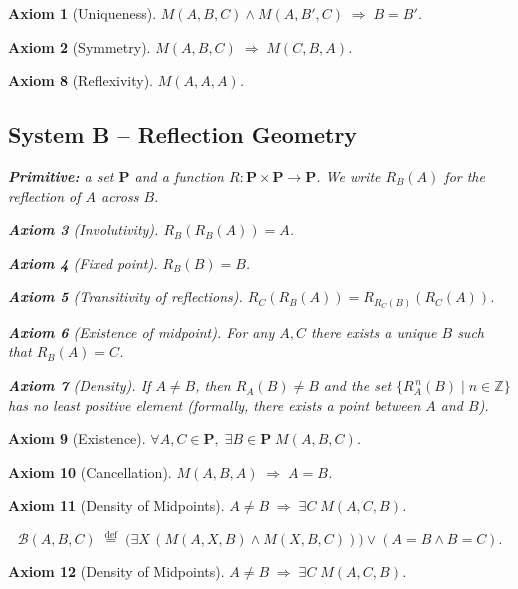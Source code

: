 \documentclass[]{article}
\newtheorem{axiom}{Axiom}
\begin{document}
\begin{axiom}[Uniqueness]
  \(M(A,B,C) \land M(A,B',C) \;\Longrightarrow\; B = B'\).
\end{axiom}
\begin{axiom}[Symmetry]
  \(M(A,B,C) \;\Longrightarrow\; M(C,B,A)\).
\end{axiom}
\begin{axiom}[Reflexivity]
  \(M(A,A,A)\).\subsection*{System B – Reflection Geometry}
\textbf{Primitive:} a set \(\mathbf{P}\) and a function
\(R : \mathbf{P} \times \mathbf{P} \to \mathbf{P}\).  We write
\(R_B(A)\) for the reflection of \(A\) across \(B\).

\begin{axiom}[Involutivity]
  \(R_B(R_B(A)) = A\).
\end{axiom}
\begin{axiom}[Fixed point]
  \(R_B(B) = B\).
\end{axiom}
\begin{axiom}[Transitivity of reflections]
  \(R_C(R_B(A)) = R_{R_C(B)}(R_C(A))\).
\end{axiom}
\begin{axiom}[Existence of midpoint]
  For any \(A,C\) there exists a unique \(B\) such that \(R_B(A)=C\).
\end{axiom}
\begin{axiom}[Density]
  If \(A \neq B\), then \(R_A(B) \neq B\) and the set
  \(\{R_A^{\,n}(B) \mid n \in \mathbb{Z}\}\) has no least positive element
  (formally, there exists a point between \(A\) and \(B\)).
\end{axiom}
\end{axiom}
\begin{axiom}[Existence]
  \(\forall A,C \in \mathbf{P},\; \exists B \in \mathbf{P}\; M(A,B,C)\).
\end{axiom}
\begin{axiom}[Cancellation]
  \(M(A,B,A) \;\Longrightarrow\; A = B\).
\end{axiom}
\begin{axiom}[Density of Midpoints]
  \(A \neq B \;\Longrightarrow\; \exists C\; M(A,C,B)\).
\end{axiom}

\[
\mathcal{B}(A,B,C) \;\overset{\text{def}}{=}\;
\bigl( \exists X\, (M(A,X,B) \land M(X,B,C)) \bigr) \lor (A=B \land B=C).
\]
\begin{axiom}[Density of Midpoints]
  \(A \neq B \;\Longrightarrow\; \exists C\; M(A,C,B)\).
\end{axiom}
\end{document}
